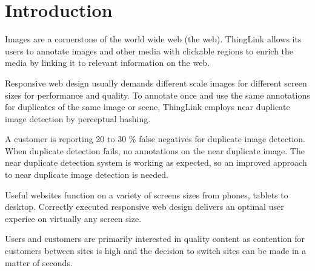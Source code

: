\documentclass[english,12pt,a4paper,pdftex,elec,utf8]{aaltothesis}
\begin{document}
\cleardoublepage
\storeinipagenumber
{}
\setcounter{page}{1}


\section{Introduction}

\thispagestyle{empty}

Images are a cornerstone of the world wide web (the web). ThingLink allows its users to annotate images and other media with clickable regions to enrich the media by linking it to relevant information on the web.

Responsive web design usually demands different scale images for different screen sizes for performance and quality. To annotate once and use the same annotations for duplicates of the same image or scene, ThingLink employs near duplicate image detection by perceptual hashing.

A customer is reporting 20 to 30 \% false negatives for duplicate image detection. When duplicate detection fails,  no annotations on the near duplicate image. The near duplicate detection system is working as expected, so an improved approach to near duplicate image detection is needed.

Useful websites function on a variety of screens sizes from phones, tablets to desktop. Correctly executed responsive web design delivers an optimal user experice on virtually any screen size.

Users and customers are primarily interested in quality content as contention for customers between sites is high and the decision to switch sites can be made in a matter of seconds.
\end{document}
